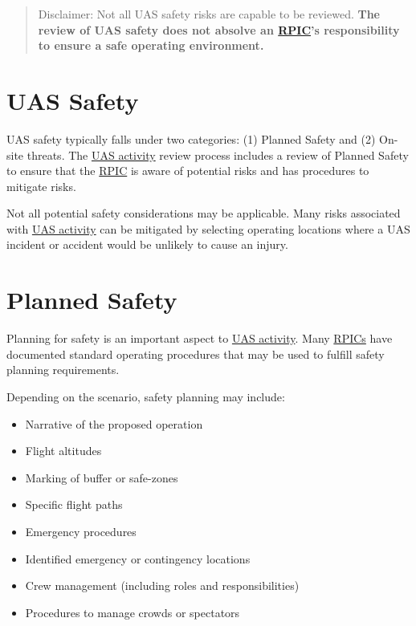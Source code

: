 \documentclass[
]{book}
\providecommand{\tightlist}{%
  \setlength{\itemsep}{0pt}\setlength{\parskip}{0pt}}
\begin{document}
\begin{quote}
Disclaimer: Not all UAS safety risks are capable to be reviewed. \textbf{The review of UAS safety does not absolve an \protect\hyperlink{RPIC}{RPIC}'s responsibility to ensure a safe operating environment.}
\end{quote}

\hypertarget{s-safety}{%
\section{UAS Safety}\label{s-safety}}

UAS safety typically falls under two categories: (1) Planned Safety and (2) On-site threats. The \protect\hyperlink{UASactivity}{UAS activity} review process includes a review of Planned Safety to ensure that the \protect\hyperlink{RPIC}{RPIC} is aware of potential risks and has procedures to mitigate risks.

Not all potential safety considerations may be applicable. Many risks associated with \protect\hyperlink{UASactivity}{UAS activity} can be mitigated by selecting operating locations where a UAS incident or accident would be unlikely to cause an injury.

\hypertarget{ss-planned-safety}{%
\section{Planned Safety}\label{ss-planned-safety}}

Planning for safety is an important aspect to \protect\hyperlink{UASactivity}{UAS activity}. Many \protect\hyperlink{RPIC}{RPICs} have documented standard operating procedures that may be used to fulfill safety planning requirements.

Depending on the scenario, safety planning may include:

\begin{itemize}
\tightlist
\item
  Narrative of the proposed operation
\item
  Flight altitudes
\item
  Marking of buffer or safe-zones
\item
  Specific flight paths
\item
  Emergency procedures
\item
  Identified emergency or contingency locations
\item
  Crew management (including roles and responsibilities)
\item
  Procedures to manage crowds or spectators
\end{itemize}
\end{document}
